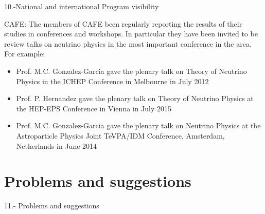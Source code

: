 \documentclass[a4paper,11pt,oneside]{article}
\begin{document}
10.-National and international Program visibility

CAFE: The members of CAFE been regularly reporting the results of their 
studies in  conferences and workshops. In particular they have been invited to
be review talks on neutrino physics in the most important conference
in the area. For example:
\begin{itemize}
\item Prof. M.C. Gonzalez-Garcia gave the plenary talk on Theory of Neutrino
Physics in the ICHEP Conference in Melbourne in July 2012
\item Prof. P. Hernandez gave the plenary talk on Theory of Neutrino Physics
at the HEP-EPS Conference in Vienna in July 2015 
\item Prof. M.C. Gonzalez-Garcia gave the plenary talk on Neutrino Physics
at the  Astroparticle Physics Joint  TeVPA/IDM Conference, Amsterdam, 
Netherlands in June 2014
\end{itemize}


\section{\bf \textsf{Problems and suggestions}}

11.- Problems and suggestions
%
\end{document}
